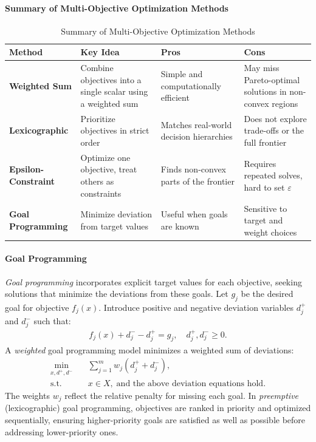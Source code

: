 \paragraph{Summary of Multi-Objective Optimization Methods}

\begin{table}[h]
\centering
\caption{Summary of Multi-Objective Optimization Methods}
\renewcommand{\arraystretch}{1.3}
\begin{tabular}{|l|p{4.2cm}|p{3.5cm}|p{3.5cm}|}
\hline
\textbf{Method} & \textbf{Key Idea} & \textbf{Pros} & \textbf{Cons} \\
\hline
\textbf{Weighted Sum} & Combine objectives into a single scalar using a weighted sum & Simple and computationally efficient & May miss Pareto-optimal solutions in non-convex regions \\
\hline
\textbf{Lexicographic} & Prioritize objectives in strict order & Matches real-world decision hierarchies & Does not explore trade-offs or the full frontier \\
\hline
\textbf{Epsilon-Constraint} & Optimize one objective, treat others as constraints & Finds non-convex parts of the frontier & Requires repeated solves, hard to set $\varepsilon$ \\
\hline
\textbf{Goal Programming} & Minimize deviation from target values & Useful when goals are known & Sensitive to target and weight choices \\
\hline
\end{tabular}
\end{table}



\paragraph{Goal Programming}
\emph{Goal programming} incorporates explicit target values for each objective, seeking solutions that minimize the deviations from these goals. Let $g_j$ be the desired goal for objective $f_j(x)$. Introduce positive and negative deviation variables $d_j^+$ and $d_j^-$ such that:
\begin{align*}
f_j(x) + d_j^- - d_j^+ = g_j, \quad d_j^+, d_j^- \ge 0.
\end{align*}
A \emph{weighted} goal programming model minimizes a weighted sum of deviations:
\begin{align*}
\min_{x, d^+, d^-} \quad & \sum_{j=1}^m w_j (d_j^+ + d_j^-), \\
\text{s.t.} \quad & x \in X, \; \text{and the above deviation equations hold.}
\end{align*}
The weights $w_j$ reflect the relative penalty for missing each goal. 
In \emph{preemptive} (lexicographic) goal programming, objectives are ranked in priority and optimized sequentially, ensuring higher-priority goals are satisfied as well as possible before addressing lower-priority ones.


